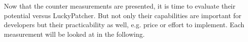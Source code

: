 Now that the counter measurements are presented, it is time to evaluate their potential versus LuckyPatcher. But not only their capabilities are important for developers but their practicability as well, e.g. price or effort to implement. Each measurement will be looked at in the following.
